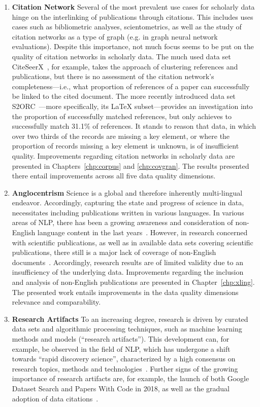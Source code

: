 \begin{enumerate}
    \item \textbf{Citation Network} Several of the most prevalent use cases for scholarly data hinge on the interlinking of publications through citations. This includes uses cases such as bibliometric analyses, scientometrics, as well as the study of citation networks as a type of graph (e.g. in graph neural network evaluations). Despite this importance, not much focus seems to be put on the quality of citation networks in scholarly data. The much used data set CiteSeerX~\cite{Wu2015,Wu2016,Patel2021}, for example, takes the approach of clustering references and publications, but there is no assessment of the citation network's completeness---i.e., what proportion of references of a paper can successfully be linked to the cited document. The more recently introduced data set S2ORC~\cite{Lo2020}---more specifically, its \LaTeX{} subset---provides an investigation into the proportion of successfully matched references, but only achieves to successfully match 31.1\% of references.
It stands to reason that data, in which over two thirds of the records are missing a key element, or where the proportion of records missing a key element is unknown, is of insufficient quality.
Improvements regarding citation networks in scholarly data are presented in Chapters~\ref{chp:corpus} and \ref{chp:covgran}. The results presented there entail improvements across all five data quality dimensions.
    \item \textbf{Anglocentrism} Science is a global and therefore inherently multi-lingual endeavor. Accordingly, capturing the state and progress of science in data, necessitates including publications written in various languages. In various areas of NLP, there has been a growing awareness and consideration of non-English language content in the last years~\cite{Dabre2020,Yu2022,Ramesh2023}. However, in research concerned with scientific publications, as well as in available data sets covering scientific publications, there still is a major lack of coverage of non-English documents~\cite{Vera-Baceta2019,Liu2019,Moed2018,Moskaleva2019,MartinMartin2021}.
Accordingly, research results are of limited validity due to an insufficiency of the underlying data.
Improvements regarding the inclusion and analysis of non-English publications are presented in Chapter~\ref{chp:xling}. The presented work entails improvements in the data quality dimensions relevance and comparability.
    \item \textbf{Research Artifacts} To an increasing degree, research is driven by curated data sets and algorithmic processing techniques, such as machine learning methods and models (``research artifacts''). This development can, for example, be observed in the field of NLP, which has undergone a shift towards ``rapid discovery science'', characterized by a high consensus on research topics, methods and technologies~\cite{Jurgens2018}. Further signs of the growing importance of research artifacts are, for example, the launch of both Google Dataset Search and Papers With Code in 2018, as well as the gradual adoption of data citations~\cite{Kratz2015}.

\end{enumerate}
